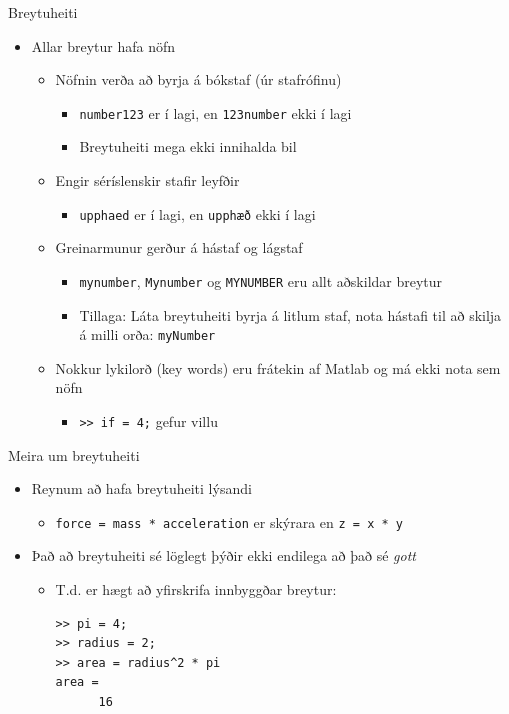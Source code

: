 \documentclass[handout]{beamer}
\begin{document}
\begin{frame}{Breytuheiti}
\begin{itemize}
 \item Allar breytur hafa nöfn
 \begin{itemize}
  \item Nöfnin verða að byrja á bókstaf (úr stafrófinu)
  \begin{itemize}
   \item \texttt{number123} er í lagi, en  \texttt{123number}  ekki í lagi
   \item Breytuheiti mega ekki innihalda bil
  \end{itemize}
  \item Engir séríslenskir stafir leyfðir
  \begin{itemize}
   \item \texttt{upphaed}  er í lagi, en  \texttt{upphæð}  ekki í lagi
  \end{itemize}
  \item Greinarmunur gerður á hástaf og lágstaf
  \begin{itemize}
   \item \texttt{mynumber}, \texttt{Mynumber} og \texttt{MYNUMBER} eru allt aðskildar breytur
   \item Tillaga: Láta breytuheiti byrja á litlum staf, nota hástafi til að skilja á milli orða: \texttt{myNumber}
  \end{itemize}
  \item Nokkur lykilorð (key words) eru frátekin af Matlab og má ekki nota sem nöfn
  \begin{itemize}
   \item \texttt{>> if = 4;}    gefur villu
  \end{itemize}
 \end{itemize}
\end{itemize}
\end{frame}

\begin{frame}[fragile]{Meira um breytuheiti}
\begin{itemize}
 \item Reynum að hafa breytuheiti lýsandi
 \begin{itemize}
  \item \texttt{force = mass * acceleration} er skýrara en \texttt{z = x * y} 
 \end{itemize}
 \item Það að breytuheiti sé löglegt þýðir ekki endilega að það sé \emph{gott}
 \begin{itemize}
  \item T.d. er hægt að yfirskrifa innbyggðar breytur:
\begin{verbatim}
>> pi = 4;
>> radius = 2;
>> area = radius^2 * pi
area = 
      16
\end{verbatim}
 \end{itemize}
\end{itemize}
\end{frame}
\end{document}
